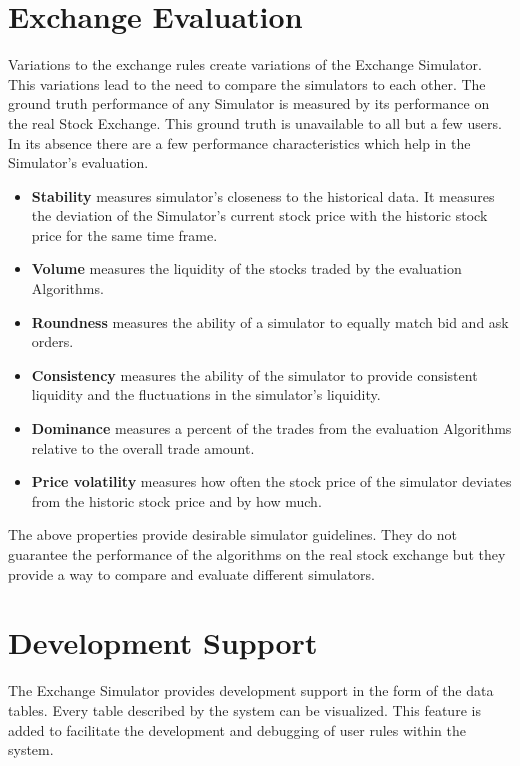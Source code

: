 \documentclass{article}
\begin{document}
\section{Exchange Evaluation}

Variations to the exchange rules create variations of the Exchange Simulator. This variations lead to the need to compare the simulators to each other. The ground truth performance of any Simulator is measured by its performance on the real Stock Exchange. This ground truth is unavailable to all but a few users. In its absence there are a few performance characteristics which help in the Simulator's evaluation.

\begin{itemize}
    \item {\bf Stability} measures simulator's closeness to the historical data. It measures the deviation of the Simulator's current stock price with the historic stock price for the same time frame. 
    \item {\bf Volume} measures the liquidity of the stocks traded by the evaluation Algorithms. 
    \item {\bf Roundness} measures the ability of a simulator to equally match bid and ask orders. 
    \item {\bf Consistency} measures the ability of the simulator to provide consistent liquidity and the fluctuations in the simulator's liquidity. 
    \item {\bf Dominance} measures a percent of the trades from the evaluation Algorithms relative to the overall trade amount. 
    \item {\bf Price volatility} measures how often the stock price of the simulator deviates from the historic stock price and by how much.
\end{itemize}

The above properties provide desirable simulator guidelines. They do not guarantee the performance of the algorithms on the real stock exchange but they provide a way to compare and evaluate different simulators.

\section{Development Support}

The Exchange Simulator provides development support in the form of the data tables. Every table described by the system can be visualized. This feature is added to facilitate the development and debugging of user rules within the system. 
\end{document}
